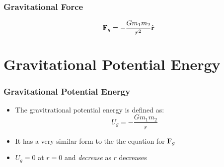 \documentclass[12pt,compress,aspectratio=169]{beamer}
\newcommand{\mb}[1]{\ensuremath\mathbf{#1}}
\begin{document}
\begin{frame}
  \frametitle{Gravitational Force}
  \begin{center}
  \end{center}
%    

  {\Large
    \begin{displaymath}
      \mb{F}_g=-\frac{Gm_1m_2}{r^2}\hat{\mb{r}}
    \end{displaymath}
  }
\end{frame}



\section{Gravitational Potential Energy}


\begin{frame}
  \frametitle{Gravitational Potential Energy}

  \begin{itemize}
  \item The gravitrational potential energy is defined as:
    {\Large
      \begin{displaymath}
        \boxed{U_g=-\frac{Gm_1m_2}{r}}
    \end{displaymath}
    }
  \item It has a very similar form to the the equation for $\mb{F}_g$
  \item $U_g=0$ at $r=0$ and \emph{decrease} as $r$ decreases
  \end{itemize}
\end{frame}
\end{document}

